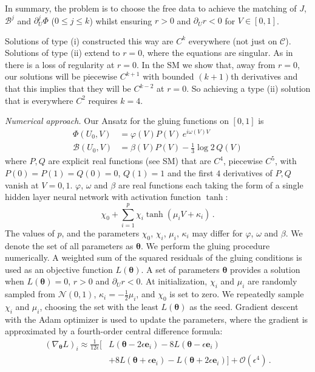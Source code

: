 \documentclass[prl,twocolumn,superscriptaddress,nofootinbib]{revtex4-2}
\begin{document}
In summary, the problem is to choose the free data to achieve the matching of $J$, $\mathcal{B}^j$ and $\partial_U^j \Phi$ ($0 \le j \le k$) whilst ensuring $r>0$ and $\partial_U r<0$ for $V \in [0,1]$.

Solutions of type (i) constructed this way are $C^k$ everywhere (not just on $\mathcal{C}$). Solutions of type (ii) extend to $r=0$, where the equations are singular. As in \cite{Kehle:2022uvc} there is a loss of regularity at $r=0$. In the SM we show that, away from $r=0$, our solutions will be piecewise $C^{k+1}$ with bounded $(k+1)$th derivatives and that this implies that they will be $C^{k-2}$ at $r=0$. So achieving a type (ii) solution that is everywhere $C^2$ requires $k=4$.

{\it Numerical approach.} Our Ansatz for the gluing functions on $[0,1]$ is
\begin{align}
    \Phi(U_0,V) &= \varphi(V) P(V)  \, e^{i \omega(V) V} \label{eq:PhiAnsatz} \\
    \mathcal{B}(U_0,V) &= \beta(V)P(V) - \frac{1}{3}\log 2 \, Q(V) \label{eq:BAnsatz}
\end{align}
\noindent where $P,Q$ are explicit real functions (see SM) that are $C^4$, piecewise $C^5$, with $P(0)=P(1)=Q(0)=0$, $Q(1)=1$ and the first $4$ derivatives of $P,Q$ vanish at $V=0,1$. $\varphi$, $\omega$ and $\beta$ are real functions each taking the form of a single hidden layer neural network with activation function $\tanh$:
\begin{equation}
    \chi_0 + \sum_{i=1}^{p} \chi_i \tanh{(\mu_i V+\kappa_i)}\,.
\end{equation}
The values of $p$, and the parameters $\chi_0$, $\chi_i$, $\mu_i$, $\kappa_i$ may differ for $\varphi$, $\omega$ and $\beta$. We denote the set of all parameters as $\boldsymbol{\theta}$.
We perform the gluing procedure numerically. A weighted sum of the squared residuals of the gluing conditions is used as an objective function $L(\boldsymbol{\theta})$. A set of parameters $\boldsymbol{\theta}$ provides a solution when $L(\boldsymbol{\theta})=0$, $r>0$ and $\partial_Ur<0$. At initialization, $\chi_i$ and $\mu_i$ are randomly sampled from $\mathcal{N}(0,1)$, $\kappa_i=-\frac{1}{2}\mu_i$, and $\chi_0$ is set to zero. We repeatedly sample $\chi_i$ and $\mu_i$, choosing the set with the least $L(\boldsymbol{\theta})$ as the seed. Gradient descent with the Adam optimizer \cite{Kingma:2015} is used to update the parameters, where the gradient is approximated by a fourth-order central difference formula:
\begin{equation}
\begin{split}
    (\nabla_{\boldsymbol{\theta}} L)_i \approx \frac{1}{12 \epsilon} \Big[
& L(\boldsymbol{\theta} - 2\epsilon \boldsymbol{e}_i)
- 8 L(\boldsymbol{\theta} - \epsilon \boldsymbol{e}_i) \\
& + 8 L(\boldsymbol{\theta} + \epsilon \boldsymbol{e}_i)
- L(\boldsymbol{\theta} + 2\epsilon \boldsymbol{e}_i)
\Big] + \mathcal{O}(\epsilon^4)\,.
\end{split}
\end{equation}
\end{document}
